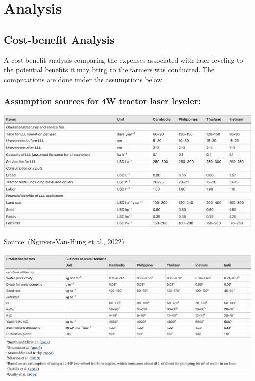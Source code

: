 \documentclass[
]{article}
\begin{document}
\hypertarget{analysis}{%
\section{Analysis}\label{analysis}}

\hypertarget{cost-benefit-analysis}{%
\subsection{Cost-benefit Analysis}\label{cost-benefit-analysis}}

A cost-benefit analysis comparing the expenses associated with laser
leveling to the potential benefits it may bring to the farmers was
conducted. The computations are done under the assumptions below.

\hypertarget{assumption-sources-for-4w-tractor-laser-leveler}{%
\subsubsection{Assumption sources for 4W tractor laser
leveler:}\label{assumption-sources-for-4w-tractor-laser-leveler}}

\includegraphics{images/Screenshot 2023-06-12 at 9.42.22 PM.png}

Source: (Nguyen-Van-Hung et al., 2022)

\includegraphics{images/Screenshot 2023-06-12 at 10.52.03 PM.png}
\end{document}
